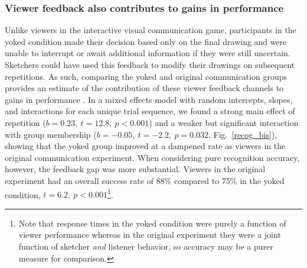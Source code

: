 \documentclass[10pt,letterpaper]{article}
\begin{document}

\vspace{2mm}

\subsubsection{Viewer feedback also contributes to gains in performance}

Unlike viewers in the interactive visual communication game, participants in the yoked condition made their decision based only on the final drawing and were unable to interrupt or await additional information if they were still uncertain.
Sketchers could have used this feedback to modify their drawings on subsequent repetitions.
As such, comparing the yoked and original communication groups provides an estimate of the contribution of these viewer feedback channels to gains in performance \cite{schober_understanding_1989}.
In a mixed effects model with random intercepts, slopes, and interactions for each unique trial sequence, we found a %
strong main effect of repetition ($b = 0.23, ~t = 12.8,~p < 0.001$) and a weaker but significant interaction with group membership ($b = -0.05, ~t = -2.2, ~p = 0.032$, Fig.~\ref{recog_bis}), showing that the yoked group improved at a dampened rate as viewers in the original communication experiment.
When considering pure recognition accuracy, however, the feedback gap was more substantial.
Viewers in the original experiment had an overall success rate of 88\% compared to 75\% in the yoked condition, $t = 6.2, ~p < 0.001$\footnote{Note that response times in the yoked condition were purely a function of viewer performance whereas in the original experiment they were a joint function of sketcher \emph{and} listener behavior, so accuracy may be a purer measure for comparison.}.
\end{document}
